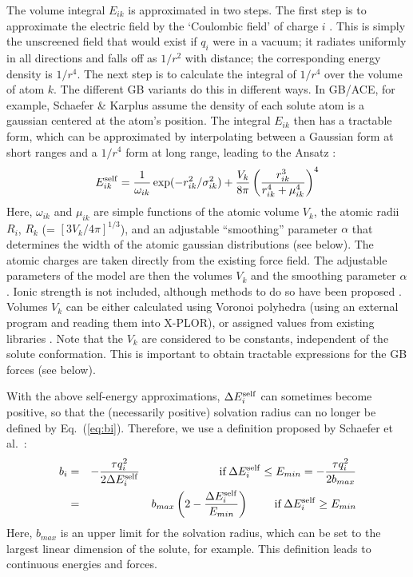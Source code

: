 \documentclass[12pt]{report}
\begin{document}
The volume integral $E_{ik}$ is approximated in two steps. The first
step is to approximate the electric field by the `Coulombic field'
of charge $i$ \cite{Schaefer90}. This is simply the unscreened field that
would exist if $q_i$ were in a vacuum; it radiates uniformly in all directions
and falls off as $1/r^2$ with distance; the corresponding energy density
is $1/r^4$. The next step is to calculate the integral of $1/r^4$ over the
volume of atom $k$. The different GB variants do this in different ways.
In GB/ACE, for example, Schaefer \& Karplus assume the density of each solute
atom is a gaussian centered at the atom's position. The integral $E_{ik}$
then has a tractable form, which can be approximated by interpolating
between a Gaussian form at short ranges and a $1/r^4$ form at long range, 
leading to the Ansatz \cite{Schaefer96}:
\begin{equation} \label{eq:ace}
E_{ik}^{\rm self} = \frac{1}{\omega_{ik}} \exp(-r_{ik}^2/\sigma^2_{ik}) + 
      \frac{V_k}{8 \pi} \left( \frac{r_{ik}^3}{r_{ik}^4 + \mu^4_{ik}} \right)^4
\end{equation}
Here, $\omega_{ik}$ and $\mu_{ik}$ are simple functions of the atomic
volume $V_k$, the atomic radii $R_i$, $R_k$ (= $[3V_k/4\pi]^{1/3}$),
and an adjustable ``smoothing'' parameter $\alpha$ that determines the
width of the atomic gaussian distributions (see below).
The atomic charges are taken directly from the existing force
field. The adjustable parameters of the model are then the volumes $V_k$
and the smoothing parameter $\alpha$. Ionic strength is not included,
although methods to do so have been proposed \cite{Onufriev00,Srinivasan99}.
Volumes $V_k$ can be either calculated using Voronoi polyhedra (using an
external program \cite{Lee71} and reading them into X-PLOR), or assigned
values from existing libraries \cite{Schaefer96,Onufriev00,Schaefer01,Lopes07}. 
Note that the $V_k$ are considered to be constants, independent of the
solute conformation. This is important to obtain tractable expressions for
the GB forces (see below).

With the above self-energy approximations, $\Delta E^{\rm self}_i$ can sometimes
become positive, so that the (necessarily positive) solvation radius can no longer
be defined by Eq.\ (\ref{eq:bi}). Therefore, we use a definition proposed by
Schaefer et al.\ \cite{Schaefer98a}:
\begin{eqnarray}
b_i &=& - \frac{\tau q_i^2}{2 \Delta E^{\rm self}_i}
     \hspace*{25mm} {\rm if } \, 
   \Delta E^{\rm self}_i \leq E_{min} = - \frac{\tau q_i^2}{2 b_{max}}
                   \nonumber \\
&=& b_{max} \left( 2 - \frac{\Delta E^{\rm self}_i}{E_{min}} \right)
     \hspace*{8mm} {\rm if } \, 
   \Delta E^{\rm self}_i \geq E_{min}  \label{eq:bi2}
\end{eqnarray}
Here, $b_{max}$ is an upper limit for the solvation radius, which can be set to
the largest linear dimension of the solute, for example. This definition leads
to continuous energies and forces.
\end{document}
